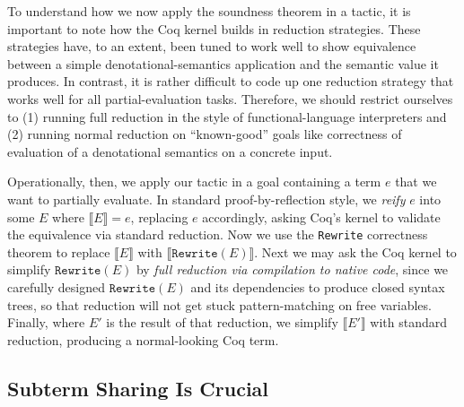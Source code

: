 To understand how we now apply the soundness theorem in a tactic, it is important to note how the Coq kernel builds in reduction strategies.
These strategies have, to an extent, been tuned to work well to show equivalence between a simple denotational-semantics application and the semantic value it produces.
In contrast, it is rather difficult to code up one reduction strategy that works well for all partial-evaluation tasks.
Therefore, we should restrict ourselves to (1) running full reduction in the style of functional-language interpreters and (2) running normal reduction on ``known-good'' goals like correctness of evaluation of a denotational semantics on a concrete input.

Operationally, then, we apply our tactic in a goal containing a term $e$ that we want to partially evaluate.
In standard proof-by-reflection style, we \emph{reify} $e$ into some $E$ where $\llbracket E \rrbracket = e$, replacing $e$ accordingly, asking Coq's kernel to validate the equivalence via standard reduction.
Now we use the \texttt{Rewrite} correctness theorem to replace $\llbracket E \rrbracket$ with $\llbracket \texttt{Rewrite}(E) \rrbracket$.
Next we may ask the Coq kernel to simplify $\texttt{Rewrite}(E)$ by \emph{full reduction via compilation to native code}, since we carefully designed $\texttt{Rewrite}(E)$ and its dependencies to produce closed syntax trees, so that reduction will not get stuck pattern-matching on free variables.
Finally, where $E'$ is the result of that reduction, we simplify $\llbracket E' \rrbracket$ with standard reduction, producing a normal-looking Coq term.


\subsection{Subterm Sharing Is Crucial}\label{sec:under-lets}

